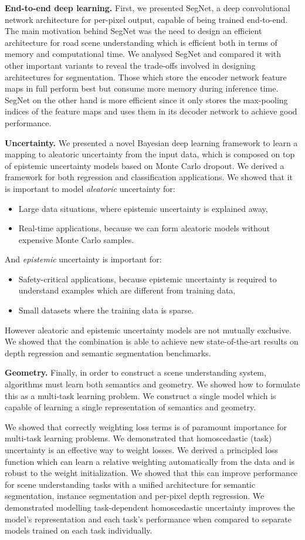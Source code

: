 \textbf{End-to-end deep learning.}
First, we presented SegNet, a deep convolutional network architecture for per-pixel output, capable of being trained end-to-end. The main motivation behind SegNet was the need to design an efficient architecture for road scene understanding which is efficient both in terms of memory and computational time. We analysed SegNet and compared it with other important variants to reveal the trade-offs involved in designing architectures for segmentation. Those which store the encoder network feature maps in full perform best but consume more memory during inference time. SegNet on the other hand is more efficient since it only stores the max-pooling indices of the feature maps and uses them in its decoder network to achieve good performance.

\textbf{Uncertainty.}
We presented a novel Bayesian deep learning framework to learn a mapping to aleatoric uncertainty from the input data, which is composed on top of epistemic uncertainty models based on Monte Carlo dropout. We derived a framework for both regression and classification applications. We showed that it is important to model \textit{aleatoric} uncertainty for:
\begin{itemize}
\item Large data situations, where epistemic uncertainty is explained away,
\item Real-time applications, because we can form aleatoric models without expensive Monte Carlo samples.
\end{itemize}
And \textit{epistemic} uncertainty is important for:
\begin{itemize}
\item Safety-critical applications, because epistemic uncertainty is required to understand examples which are different from training data,
\item Small datasets where the training data is sparse.
\end{itemize}

However aleatoric and epistemic uncertainty models are not mutually exclusive. We showed that the combination is able to achieve new state-of-the-art results on depth regression and semantic segmentation benchmarks.

\textbf{Geometry.}
Finally, in order to construct a scene understanding system, algorithms must learn both semantics and geometry. We showed how to formulate this as a multi-task learning problem. We construct a single model which is capable of learning a single representation of semantics and geometry. 

We showed that correctly weighting loss terms is of paramount importance for multi-task learning problems. We demonstrated that homoscedastic (task) uncertainty is an effective way to weight losses. We derived a principled loss function which can learn a relative weighting automatically from the data and is robust to the weight initialization. We showed that this can improve performance for scene understanding tasks with a unified architecture for semantic segmentation, instance segmentation and per-pixel depth regression. We demonstrated modelling task-dependent homoscedastic uncertainty improves the model's representation and each task's performance when compared to separate models trained on each task individually.
